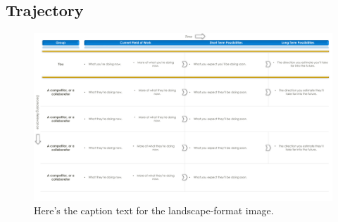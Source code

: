 \documentclass[pdftex,12pt,a4paper]{article}
\begin{document}
\blindtext		%

\subsection{Trajectory} \label{sec:trajectory}
\blindtext		%

\newpage



\begin{landscape}
\thispagestyle{empty}	%

\hfill	%

\begin{center}
	\begin{figure}[h] 
		\centering
		\includegraphics[scale=0.8]{Images/competitor_trajectories}
		\caption{Here's the caption text for the landscape-format image.}
		\label{fig:competitor_trajectories}	%
	\end{figure}
\end{center}

\hfill	%

\end{landscape}
\end{document}
